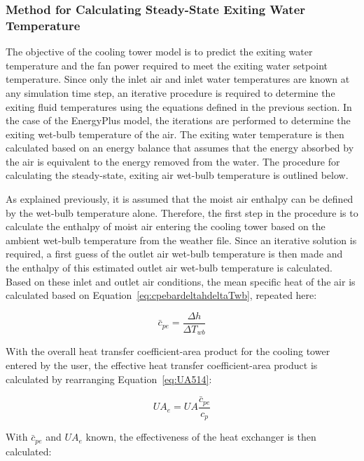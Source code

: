 \subsubsection{Method for Calculating Steady-State Exiting Water Temperature}\label{method-for-calculating-steady-state-exiting-water-temperature}

The objective of the cooling tower model is to predict the exiting water temperature and the fan power required to meet the exiting water setpoint temperature. Since only the inlet air and inlet water temperatures are known at any simulation time step, an iterative procedure is required to determine the exiting fluid temperatures using the equations defined in the previous section. In the case of the EnergyPlus model, the iterations are performed to determine the exiting wet-bulb temperature of the air. The exiting water temperature is then calculated based on an energy balance that assumes that the energy absorbed by the air is equivalent to the energy removed from the water. The procedure for calculating the steady-state, exiting air wet-bulb temperature is outlined below.

As explained previously, it is assumed that the moist air enthalpy can be defined by the wet-bulb temperature alone. Therefore, the first step in the procedure is to calculate the enthalpy of moist air entering the cooling tower based on the ambient wet-bulb temperature from the weather file. Since an iterative solution is required, a first guess of the outlet air wet-bulb temperature is then made and the enthalpy of this estimated outlet air wet-bulb temperature is calculated. Based on these inlet and outlet air conditions, the mean specific heat of the air is calculated based on Equation~\ref{eq:cpebardeltahdeltaTwb}, repeated here:

\begin{equation}
\bar c_{pe} = \frac{{\Delta h}}{{\Delta T_{wb}}}
\end{equation}

With the overall heat transfer coefficient-area product for the cooling tower entered by the user, the effective heat transfer coefficient-area product is calculated by rearranging Equation~\ref{eq:UA514}:

\begin{equation}
UA_e = UA\frac{{\bar c_{pe}}}{{c_p}}
\end{equation}

With \(\bar c_{pe}\) and \(UA_e\) known, the effectiveness of the heat exchanger is then calculated:

